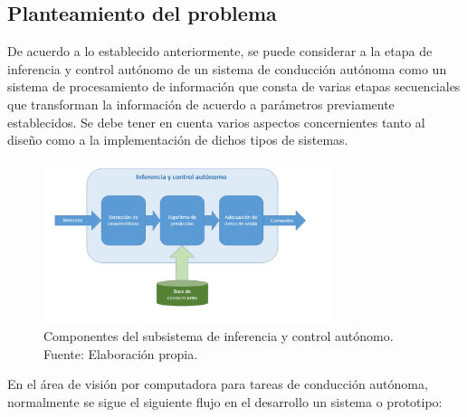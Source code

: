 \documentclass[12pt,letterpaper]{article}
\begin{document}
%
\subsection{Planteamiento del problema}

% 
De acuerdo a lo establecido anteriormente, se puede considerar a la etapa de inferencia y control autónomo de 
un sistema de conducción autónoma como un sistema de procesamiento de información que consta de varias etapas 
secuenciales que transforman la información de acuerdo a parámetros previamente establecidos. Se debe tener en 
cuenta varios aspectos concernientes tanto al diseño como a la implementación de dichos tipos de sistemas. 

\begin{figure}[!h] 
    \centering
    \includegraphics[width=0.75\textwidth]{img/inferencia}
    \caption{Componentes del subsistema de inferencia y control autónomo. Fuente: Elaboración propia.}
    \label{fig:inferencia}
\end{figure}


En el área de visión por computadora para tareas de conducción autónoma, normalmente se sigue el siguiente 
flujo en el desarrollo un sistema o prototipo:
\end{document}
